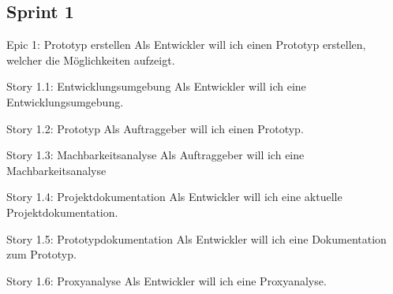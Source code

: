\subsection{Sprint 1}

\begin{epic}{Epic 1: Prototyp erstellen}
  Als Entwickler will ich einen Prototyp erstellen, welcher die Möglichkeiten 
aufzeigt.
\end{epic}

\begin{story}{Story 1.1:  Entwicklungsumgebung}
  Als Entwickler will ich eine Entwicklungsumgebung.
\end{story}

\begin{story}{Story 1.2:  Prototyp}
  Als Auftraggeber will ich einen Prototyp.
\end{story}


\begin{story}{Story 1.3:  Machbarkeitsanalyse}
Als Auftraggeber will ich eine Machbarkeitsanalyse
\end{story}

\begin{story}{Story 1.4:  Projektdokumentation}
Als Entwickler will ich eine aktuelle Projektdokumentation.
\end{story}

\begin{story}{Story 1.5:  Prototypdokumentation}
Als Entwickler will ich eine Dokumentation zum Prototyp.
\end{story}

\begin{story}{Story 1.6:  Proxyanalyse}
  Als Entwickler will ich eine Proxyanalyse.
\end{story}
